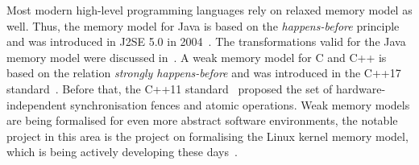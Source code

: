 Most modern high-level programming languages rely on relaxed memory model as well.
Thus, the memory model for Java is based on the \textit{happens-before} principle~\cite{lamport1978time} and was introduced in J2SE 5.0 in 2004~\cite{manson2005java}.
The transformations valid for the Java memory model were discussed in~\cite{sevcik2009program}. 
A weak memory model for C and C++ is based on the relation \textit{strongly happens-before} and was introduced in the C++17 standard~\cite{batty2011mathematizing}.
Before that, the C++11 standard~\cite{iso2012iec} proposed the set of hardware-independent synchronisation fences and atomic operations.
Weak memory models are being formalised for even more abstract software environments, the notable project in this area is the project on formalising the Linux kernel memory model, which is being actively developing these days~\cite{alglave2018frightening, kernel1}.

